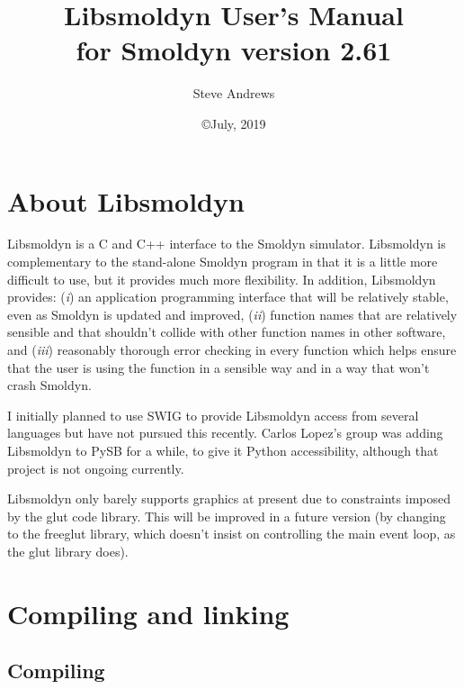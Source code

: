 \documentclass {book}
\begin{document}



\title{\textbf{Libsmoldyn User's Manual} \\ \large for Smoldyn version 2.61}
\date{\copyright July, 2019}
\author{Steve Andrews}
\maketitle

\tableofcontents


\chapter{About Libsmoldyn}
Libsmoldyn is a C and C++ interface to the Smoldyn simulator.  Libsmoldyn is complementary to the stand-alone Smoldyn program in that it is a little more difficult to use, but it provides much more flexibility.  In addition, Libsmoldyn provides: (\emph{i}) an application programming interface that will be relatively stable, even as Smoldyn is updated and improved, (\emph{ii}) function names that are relatively sensible and that shouldn't collide with other function names in other software, and (\emph{iii}) reasonably thorough error checking in every function which helps ensure that the user is using the function in a sensible way and in a way that won't crash Smoldyn.

I initially planned to use SWIG to provide Libsmoldyn access from several languages but have not pursued this recently.  Carlos Lopez's group was adding Libsmoldyn to PySB for a while, to give it Python accessibility, although that project is not ongoing currently.

Libsmoldyn only barely supports graphics at present due to constraints imposed by the glut code library.  This will be improved in a future version (by changing to the freeglut library, which doesn't insist on controlling the main event loop, as the glut library does).


\chapter{Compiling and linking}

\section{Compiling}
\end{document}
